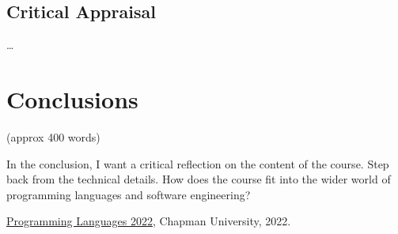 \documentclass{article}
\theoremstyle{theorem}
\theoremstyle{definition}
\theoremstyle{remark}
\begin{document}
\subsection{Critical Appraisal}

\ldots

\section{Conclusions}\label{conclusions}

(approx 400 words)

In the conclusion, I want a critical reflection on the content of the course. Step back from the technical details. How does the course fit into the wider world of programming languages and software engineering?

\begin{thebibliography}{99}
 \href{https://github.com/alexhkurz/programming-languages-2022/blob/main/README.md}{Programming Languages 2022}, Chapman University, 2022.
\end{thebibliography}
\end{document}
